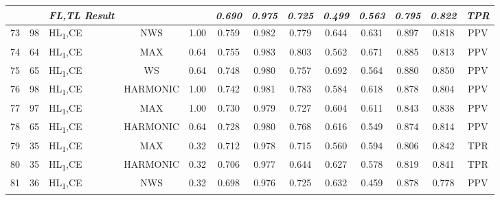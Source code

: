 \begin{table}[H]
{\begin{tabular}{cc|l|cc|c|c|c|c|c|c|c|c|}
   &
    \textit{\textbf{}} &
    \textit{\textbf{FL,TL Result}} &
     &
     &
    \textit{\textbf{0.690}} &
    \textit{\textbf{0.975}} &
    \textit{\textbf{0.725}} &
    \textit{\textbf{0.499}} &
    \textit{\textbf{0.563}} &
    \textit{\textbf{0.795}} &
    \textit{\textbf{0.822}} &
    \textit{\textbf{TPR}} \\ \hline
    \multicolumn{1}{|c|}{73} &
    98 &
    HL\textsubscript{1},CE &
    \multicolumn{1}{c|}{NWS} &
    1.00 &
    0.759 &
    0.982 &
    0.779 &
    0.644 &
    0.631 &
    0.897 &
    0.818 &
    PPV \\ \hline
  \multicolumn{1}{|c|}{74} &
    64 &
    HL\textsubscript{1},CE &
    \multicolumn{1}{c|}{MAX} &
    0.64 &
    0.755 &
    0.983 &
    0.803 &
    0.562 &
    0.671 &
    0.885 &
    0.813 &
    PPV \\ \hline
  \multicolumn{1}{|c|}{75} &
    65 &
    HL\textsubscript{1},CE &
    \multicolumn{1}{c|}{WS} &
    0.64 &
    0.748 &
    0.980 &
    0.757 &
    0.692 &
    0.564 &
    0.880 &
    0.850 &
    PPV \\ \hline
  \multicolumn{1}{|c|}{76} &
    98 &
    HL\textsubscript{1},CE &
    \multicolumn{1}{c|}{HARMONIC} &
    1.00 &
    0.742 &
    0.981 &
    0.783 &
    0.584 &
    0.618 &
    0.878 &
    0.804 &
    PPV \\ \hline
  \multicolumn{1}{|c|}{77} &
    97 &
    HL\textsubscript{1},CE &
    \multicolumn{1}{c|}{MAX} &
    1.00 &
    0.730 &
    0.979 &
    0.727 &
    0.604 &
    0.611 &
    0.843 &
    0.838 &
    PPV \\ \hline
  \multicolumn{1}{|c|}{78} &
    65 &
    HL\textsubscript{1},CE &
    \multicolumn{1}{c|}{HARMONIC} &
    0.64 &
    0.728 &
    0.980 &
    0.768 &
    0.616 &
    0.549 &
    0.874 &
    0.814 &
    PPV \\ \hline
  \multicolumn{1}{|c|}{79} &
    35 &
    HL\textsubscript{1},CE &
    \multicolumn{1}{c|}{MAX} &
    0.32 &
    0.712 &
    0.978 &
    0.715 &
    0.560 &
    0.594 &
    0.806 &
    0.842 &
    TPR \\ \hline
  \multicolumn{1}{|c|}{80} &
    35 &
    HL\textsubscript{1},CE &
    \multicolumn{1}{c|}{HARMONIC} &
    0.32 &
    0.706 &
    0.977 &
    0.644 &
    0.627 &
    0.578 &
    0.819 &
    0.841 &
    TPR \\ \hline
  \multicolumn{1}{|c|}{81} &
    36 &
    HL\textsubscript{1},CE &
    \multicolumn{1}{c|}{NWS} &
    0.32 &
    0.698 &
    0.976 &
    0.725 &
    0.632 &
    0.459 &
    0.878 &
    0.778 &
    PPV \\ \hline

\end{tabular}}
\end{table}
